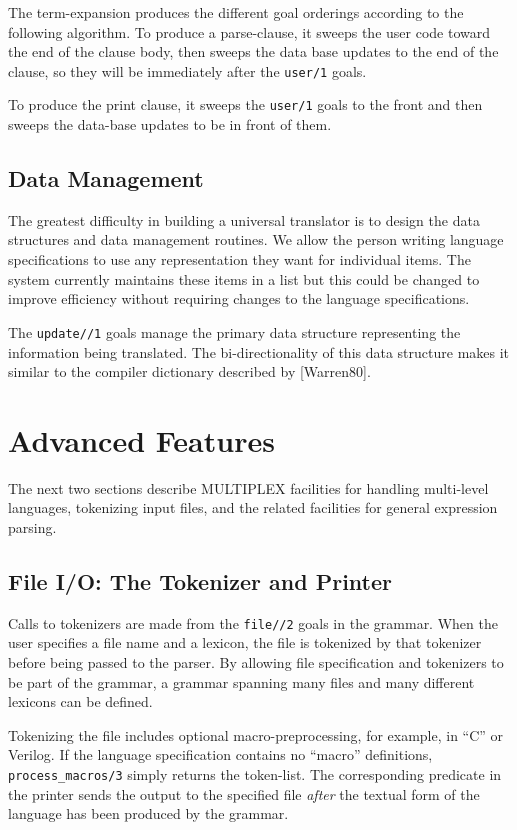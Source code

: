 The term-expansion produces the different goal orderings
according to the following algorithm. To produce a parse-clause,
it sweeps the user code toward the end of the clause body, 
then sweeps the data base updates to the end of the clause,
so they will be immediately after the {\tt user/1} goals. 

To produce the print clause, it sweeps the {\tt user/1}
goals to the front and then sweeps the data-base
updates to be in front of them.

\subsection{Data Management}

The greatest difficulty in building a universal translator
is to design the data structures and data management routines.
We allow the person writing language specifications to use
any representation they want for individual items.
The system currently maintains these items in a list
but this could be changed to improve efficiency without
requiring changes to the language specifications.

The {\tt update//1} goals manage the primary
data structure representing the information being translated.
The bi-directionality of this data structure makes it
similar to the compiler dictionary described by [Warren80].

\section{Advanced Features}

The next two sections describe MULTIPLEX facilities for
handling multi-level languages, tokenizing input files,
and the related facilities for general expression parsing.

\subsection{File I/O: The Tokenizer and Printer}
Calls to tokenizers are made from the {\tt file//2} goals
in the grammar. When the user specifies a file name and
a lexicon, the file is tokenized by that tokenizer before
being passed to the parser.  By allowing file specification
and tokenizers to be part of the grammar, a grammar spanning
many files and many different lexicons can be defined.

Tokenizing the file includes optional macro-preprocessing,
for example, in ``C'' or Verilog. If the language specification
contains no ``macro'' definitions, {\tt process\_macros/3}
simply returns the token-list.
The corresponding predicate in the printer sends the
output to the specified file {\it after} the
textual form of the language has been produced by the grammar.

